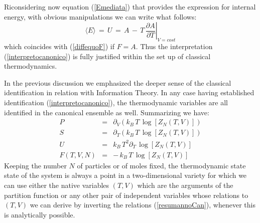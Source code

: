 \documentclass[10pt,a4paper]{article}
\begin{document}
Riconsidering now equation (\ref{Emediata}) that provides the expression for
internal energy, with obvious manipulations we can write what follows:
\begin{equation}\label{diffequoA}
   \langle E \rangle \, = \, U \, = \,A \, -  \, T \, \left.\frac{\partial A}{\partial
    T}\right|_{V=cost}
\end{equation}
which coincides with (\ref{diffequoF}) if $F=A$. Thus  the interpretation (\ref{interpretocanonico}) is fully justified within the set up
of classical thermodynamics.
\par In the previous discussion we emphasized  the deeper sense of the classical identification in relation with Information Theory.
In any case having established   identification
(\ref{interpretocanonico}),  the thermodynamic variables are all identified in the canonical ensemble as well.
Summarizing we have:
\begin{eqnarray}
\label{resumannoCan}
P &=&  \partial_V \left(k_B \, T \, \log \left[Z_N\left(T,V\right)\right]\right) \nonumber\\
S  &=& \partial_T \left(k_B \, T \, \log \left[Z_N\left(T,V\right)\right]\right) \nonumber\\
U  &=& k_B \, T^2 \partial_T
    \,\log\left[ Z_N\left(T,V\right)\right]\nonumber\\
F(T,V,N) &=& -\, k_B \, T \, \log
    \left[Z_N\left(T,V\right)\right]
\end{eqnarray}
Keeping the number $N$ of particles  or of moles fixed, the thermodynamic state state of the system is always a point in a two-dimensional variety for which we can use either the native variables $(T,V)$ which are the arguments of the partition function or any other pair of independent variables whose relations to $(T,V)$ we can derive by inverting the relations
(\ref{resumannoCan}), whenever this is analytically possible.
\end{document}
